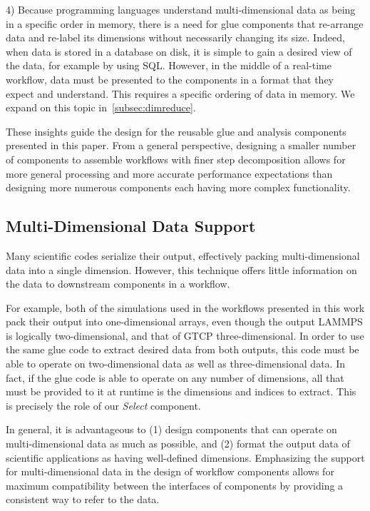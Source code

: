 \documentclass[conference]{IEEEtran}
\begin{document}
4) Because programming languages understand multi-dimensional data as being
  in a specific order in memory, there is a need for glue components that re-arrange
  data and re-label its dimensions without necessarily changing its size. Indeed,
  when data is stored in a database on disk, it is simple to gain a desired
  view of the data, for example by using SQL. However, in the middle of a
  real-time workflow, data must be presented to the components in a format that
  they expect and understand. This requires a specific ordering of
  data in memory. We expand on this topic
  in~\autoref{subsec:dimreduce}.

These insights guide the design for the reusable glue and analysis
components presented in this
paper. From a general perspective, designing a smaller number of
components to assemble workflows with finer step decomposition
allows for more general processing and more accurate performance
expectations than designing more numerous components each having more
complex functionality.

\subsection{Multi-Dimensional Data Support}

Many scientific codes serialize their output, effectively packing
multi-dimensional data into a single dimension. However, this technique offers
little information on the data to downstream components in a workflow.

For example, both of the simulations used in the workflows presented in this work
pack their output into one-dimensional arrays, even
though the output LAMMPS is logically two-dimensional, and that
of GTCP three-dimensional.
In order to use the same glue code to extract desired data from both outputs,
this code must be able to operate on two-dimensional data
as well as three-dimensional data. In fact, if the glue code is able to operate
on any number of dimensions, all that must be provided to it
at runtime is the
dimensions and indices to extract. This is precisely the role of our
{\em Select} component.

In general, it is advantageous to (1) design components that can operate on
multi-dimensional data as much as possible, and (2) format the output data of
scientific applications as having well-defined dimensions. Emphasizing the
support for multi-dimensional data in the design of workflow components allows
for maximum compatibility between the interfaces of components by providing a
consistent way to refer to the data.
\end{document}
